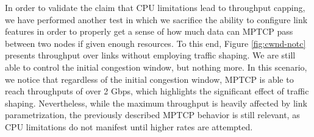 In order to validate the claim that CPU limitations lead to throughput
capping, we have performed another test in which we sacrifice the ability
to configure link features in order to properly get a sense of how much
data can MPTCP pass between two nodes if given enough resources. To this end,
Figure \ref{fig:cwnd-notc} presents throughput over links without employing
traffic shaping. We are still able to control the initial congestion window,
but nothing more. In this scenario, we notice that regardless of the initial
congestion window, MPTCP is able to reach throughputs of over 2 Gbps, which
highlights the significant effect of traffic shaping. Nevertheless, while the
maximum throughput is heavily affected by link parametrization, the previously
described MPTCP behavior is still relevant, as CPU limitations do not manifest
until higher rates are attempted.

